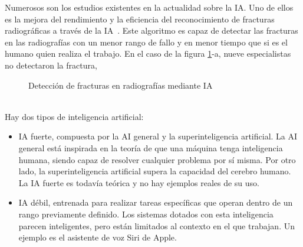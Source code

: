 Numerosos son los estudios existentes en la actualidad sobre la IA. Uno de ellos es la mejora del rendimiento y la eficiencia  del reconocimiento de fracturas radiográficas a través de la IA~\cite{guermazi21}. Este algoritmo es capaz de detectar las fracturas en las radiografías con un menor rango de fallo y en menor tiempo que si es el humano quien realiza el trabajo. En el caso de la figura \ref{fig:rads}-a, nueve especialistas no detectaron la fractura, 
\begin{figure}[h!]
  \begin{center}
    \hspace{2mm}
  \end{center}
\caption{Detección de fracturas en radiografías mediante IA} \label{fig:rads}
\end{figure}\\

Hay dos tipos de inteligencia artificial:
\begin{itemize}
 \item{IA fuerte,} compuesta por la AI general y la superinteligencia artificial. La AI general está inspirada en la teoría de que una máquina tenga inteligencia humana, siendo capaz de resolver cualquier problema por sí misma. Por otro lado, la superinteligencia artificial supera la capacidad del cerebro humano. La IA fuerte es todavía teórica y no hay ejemplos reales de su uso.
  \item{IA débil,} entrenada para realizar tareas específicas que operan dentro de un rango previamente definido. Los sistemas dotados con esta inteligencia parecen inteligentes, pero están limitados al contexto en el que trabajan. Un ejemplo es el asistente de voz Siri de Apple.
\end{itemize}

